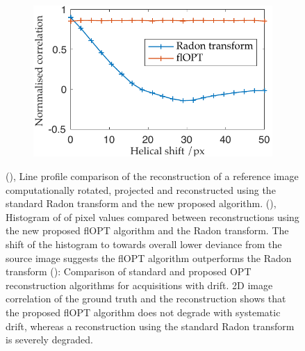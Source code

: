 \documentclass[times, twoside, watermark]{zHenriquesLab-StyleBioRxiv}
\begin{document}
\begin{figure}
\begin{subfigure}[t]{0.45\linewidth}
    \caption{}\label{fig:flopt_histogram}
  \end{subfigure}\\
  \begin{subfigure}[t]{0.45\linewidth}
    \centering
    \includegraphics[width=\linewidth]{./figures/results/correlation_helicity}
    \caption{}\label{fig:helical_comparison}
  \end{subfigure}
  \caption{
  (), Line profile comparison of the reconstruction of a reference image computationally rotated, projected and reconstructed using the standard \gls*{Radon transform} and the new proposed algorithm.
  (), Histogram of of pixel values compared between reconstructions using the new proposed flOPT algorithm and the \gls*{Radon transform}.
  The shift of the histogram to towards overall lower deviance from the source image suggests the flOPT algorithm outperforms the \gls*{Radon transform}
  (): Comparison of standard and proposed \gls*{OPT} reconstruction algorithms for acquisitions with drift.
  2D image correlation of the ground truth and the reconstruction shows that the proposed flOPT algorithm does not degrade with systematic drift, whereas a reconstruction using the standard \gls*{Radon transform} is severely degraded.}
\end{figure}
\end{document}
